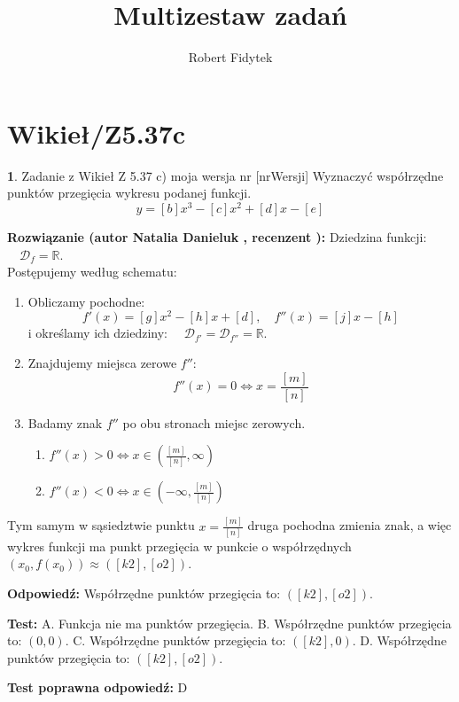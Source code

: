 \documentclass[12pt, a4paper]{article}
\title{Multizestaw zadań}
\author{Robert Fidytek}
\date{}
\theoremstyle{definition} %
\newtheorem{zad}{}
\newcommand{\kategoria}[1]{\section{#1}} %
\newcommand{\zadStart}[1]{\begin{zad}#1\newline} %
\newcommand{\zadStop}{\end{zad}}   %
\newcommand{\rozwStart}[2]{\noindent \textbf{Rozwiązanie (autor #1 , recenzent #2): }\newline} %
\newcommand{\rozwStop}{\newline}                                            %
\newcommand{\odpStart}{\noindent \textbf{Odpowiedź:}\newline}    %
\newcommand{\odpStop}{\newline}                                             %
\newcommand{\testStart}{\noindent \textbf{Test:}\newline} %
\newcommand{\testStop}{\newline} %
\newcommand{\kluczStart}{\noindent \textbf{Test poprawna odpowiedź:}\newline} %
\newcommand{\kluczStop}{\newline} %
\begin{document}
\maketitle

\kategoria{Wikieł/Z5.37c}

\zadStart{Zadanie z Wikieł Z 5.37 c) moja wersja nr [nrWersji]}
Wyznaczyć współrzędne punktów przegięcia wykresu podanej funkcji.
$$y = [b]x^3 - [c]x^2 + [d]x - [e]$$
\zadStop

\rozwStart{Natalia Danieluk}{}
Dziedzina funkcji: $\quad \mathcal{D}_f=\mathbb{R}$. \\
Postępujemy według schematu:
\begin{enumerate}
\item Obliczamy pochodne: 
$$f'(x) = [g]x^2 - [h]x + [d],\quad f''(x) = [j]x - [h]$$
i określamy ich dziedziny: $\quad \mathcal{D}_{f'}=\mathcal{D}_{f''}=\mathbb{R}$. \\
\item Znajdujemy miejsca zerowe $f''$: 
$$f''(x)=0 \Leftrightarrow x=\frac{[m]}{[n]}$$
\item Badamy znak $f''$ po obu stronach miejsc zerowych. \\
	\begin{enumerate}
	\item $f''(x) > 0 \Leftrightarrow x \in (\frac{[m]}{[n]},\infty)$\\
	\item $f''(x) < 0 \Leftrightarrow x \in (-\infty,\frac{[m]}{[n]})$
	\end{enumerate}
\end{enumerate}
Tym samym w sąsiedztwie punktu $x=\frac{[m]}{[n]}$ druga pochodna zmienia znak, a więc wykres funkcji ma punkt przegięcia w punkcie o współrzędnych $(x_0,f(x_0)) \approx ([k2],[o2])$.
\rozwStop

\odpStart
Współrzędne punktów przegięcia to: $([k2],[o2])$.
\odpStop

\testStart
A. Funkcja nie ma punktów przegięcia.
B. Współrzędne punktów przegięcia to: $(0,0)$.
C. Współrzędne punktów przegięcia to: $([k2],0)$.
D. Współrzędne punktów przegięcia to: $([k2],[o2])$.
\testStop

\kluczStart
D
\kluczStop
\end{document}
